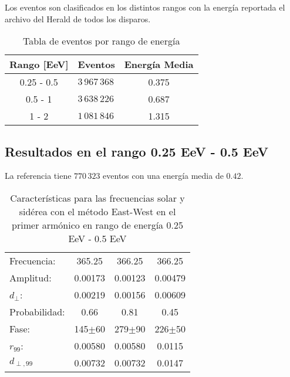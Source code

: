 Los eventos son clasificados en los distintos rangos con la energía reportada el archivo del Herald de todos los disparos.
\begin{table}[H]
    \begin{small}
        \begin{center}
            \begin{tabular}[c]{c|l|c}
                \multicolumn{1}{c|}{\textbf{Rango [EeV]}} & 
                \multicolumn{1}{c|}{\textbf{Eventos}} 
                & \bf{Energía Media} \\
                \hline
                0.25 - 0.5  & $3\,967\,368$ & 0.375\\
                0.5  - 1    & $3\,638\,226$ & 0.687\\
                1    - 2    & $1\,081\,846$ & 1.315 \\
            \end{tabular}
            \caption{Tabla de eventos por rango de energía }
            \label{tab:}
        \end{center}
    \end{small}
\end{table}


\subsection*{Resultados en el rango 0.25 EeV - 0.5 EeV}

La referencia tiene $770\,323$ eventos con una energía media de $0.42$.

\begin{table}[H]
    \begin{small}
        \begin{center}
            \begin{tabular}[c]{l|c||c|c}
                Frecuencia:     & 365.25	  & 366.25	   & 366.25 \cite{Aab_2020}   \\
                Amplitud:       & 0.00173	  & 0.00123	   & 0.00479      \\
                $d_\perp$:      & 0.00219	  & 0.00156	   & 0.00609       \\
                Probabilidad:   & 0.66        & 0.81	   & 0.45       \\
                Fase:           & 145$\pm$60  & 279$\pm$90 & 226$\pm$50   	\\
                $r_{99}$:       & 0.00580	  & 0.00580    & 0.0115       \\
                $d_{\perp,99}$  & 0.00732     & 0.00732    & 0.0147       \\
            \end{tabular}
        \end{center}
    \end{small}
    \caption{Características para las frecuencias solar y sidérea con el método East-West en el primer armónico en rango de energía 0.25 EeV - 0.5 EeV}
    \label{tab:solar}
\end{table}

